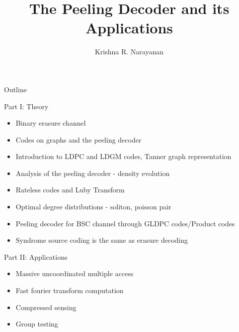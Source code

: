 \documentclass[10pt,xcolor=table]{beamer}
\begin{document}
\title{The Peeling Decoder and its Applications}
\author{ Krishna R. Narayanan
}
\date{}
\frame{\titlepage}
\begin{frame}{Outline}
\begin{block}{Part I: Theory}
\begin{itemize}
  \item Binary erasure channel
  \item Codes on graphs and the peeling decoder
  \item Introduction to LDPC and LDGM codes, Tanner graph representation
  \item Analysis of the peeling decoder - density evolution
  \item Rateless codes and Luby Transform
  \item Optimal degree distributions - soliton, poisson pair
  \item Peeling decoder for BSC channel through GLDPC codes/Product codes
  \item Syndrome source coding is the same as erasure decoding
\end{itemize}
\end{block}

\begin{block}{Part II: Applications}
\begin{itemize}
  \item Massive uncoordinated multiple access
  \item Fast fourier transform computation
  \item Compressed sensing
  \item Group testing
\end{itemize}
\end{block}
\end{frame}
\end{document}
